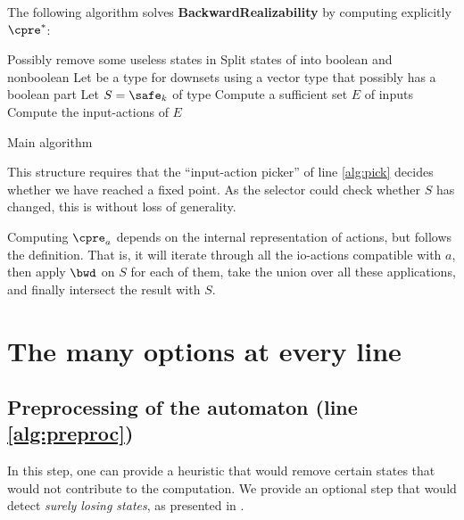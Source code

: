 \documentclass[sigconf,screen,nonacm]{acmart}
\begin{document}
The following algorithm solves \textbf{BackwardRealizability} by computing
explicitly \(\cpre^*\):
\begin{algorithm}
  \LinesNumbered
{}

\BlankLine

Possibly remove some useless states in \cA\;\label{alg:preproc}
Split states of \cA into boolean and nonboolean\;\label{alg:bool}
Let \Downset be a type for downsets using a vector type that possibly has a
boolean part\;\label{alg:types}
Let \(S = \safe_k\) of type \Downset\;
Compute a sufficient set \(E\) of  inputs\;\label{alg:inputs}
Compute the input-actions of \(E\)\;\label{alg:actions}
\caption{Main algorithm}\label{main_algo}
\end{algorithm}

This structure requires that the ``input-action picker'' of line \ref{alg:pick}
decides whether we have reached a fixed point.  As the selector could check
whether \(S\) has changed, this is without loss of generality.

Computing \(\cpre_a\) depends on the internal representation of actions, but
follows the definition.  That is, it will iterate through all the io-actions
compatible with \(a\), then apply \(\bwd\) on \(S\) for each of them, take the union
over all these applications, and finally intersect the result with \(S\).

\section{The many options at every line}

\subsection{Preprocessing of the automaton (line \ref{alg:preproc})}

In this step, one can provide a heuristic that would remove certain states that
would not contribute to the computation.  We provide an optional step that would
detect \emph{surely losing states}, as presented in \cite{...}.
\end{document}
